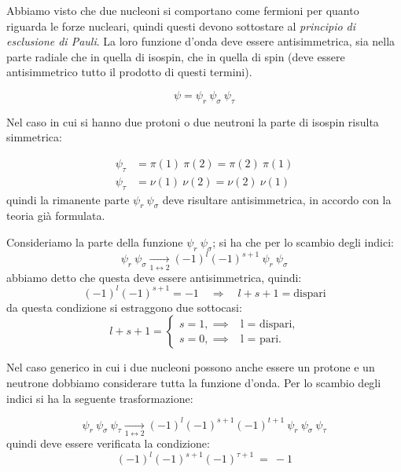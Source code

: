 \breaknote

Abbiamo  visto che due nucleoni si comportano come
fermioni per quanto riguarda le forze nucleari, quindi questi devono sottostare
al \textit{principio di esclusione di Pauli}.
La loro funzione d'onda deve essere antisimmetrica, sia nella parte radiale che
in quella di isospin, che in quella di spin (deve essere antisimmetrico tutto il
prodotto di questi termini).

\begin{equation*}
\psi = \psi_r  \ \psi_\sigma \ \psi_\tau
\end{equation*}

Nel caso in cui si hanno due protoni o due neutroni la parte di isospin risulta
simmetrica:

\begin{align*}
\psi_\tau &= \pi(1) \ \pi(2) = \pi(2) \ \pi(1) \\
\psi_\tau &= \nu(1) \ \nu(2) = \nu(2) \ \nu(1)
\end{align*}
quindi la rimanente parte $\psi_r \ \psi_\sigma$ deve risultare antisimmetrica,
in accordo con la teoria già formulata.

Consideriamo la parte della funzione $\psi_r \ \psi_\sigma$; si ha che per lo
scambio degli indici:
\begin{equation*}
\psi_r \ \psi_\sigma \xrightarrow[1\leftrightarrow2]{} (-1)^l (-1)^{s+1} \ \psi_r \ \psi_\sigma
\end{equation*}
abbiamo detto che questa deve essere antisimmetrica, quindi:
\begin{equation*}
  (-1)^l (-1)^{s+1} = -1 \quad \Longrightarrow \quad l+s+1 = \text{dispari}
\end{equation*}
da questa condizione si estraggono due sottocasi:
\begin{equation*}
l+s+1=
\begin{cases}
s=1,      \implies & \text{l \ = \ dispari,} \\
s=0, 	     \implies& \text{l \ = \ pari.}
\end{cases}
\end{equation*}

Nel caso generico in cui i due nucleoni possono anche essere un protone e un
neutrone dobbiamo considerare tutta la funzione d'onda. 
Per lo scambio degli indici si ha la seguente trasformazione:

\begin{equation*}
\psi_r \ \psi_\sigma \ \psi_\tau  \xrightarrow[1\leftrightarrow2]{} (-1)^l (-1)^{s+1} (-1)^{t +1}  \ \psi_r \ \psi_\sigma \ \psi_\tau
\end{equation*}
quindi deve essere verificata la condizione:
\begin{equation*}
(-1)^l (-1)^{s+1} (-1)^{\tau +1} \ = \ -1
\end{equation*}

